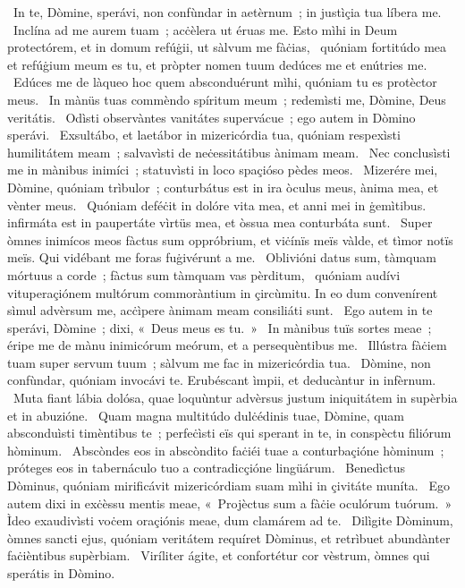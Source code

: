 \psalmChapterWithInscription{}
{ }
{%
~In te, Dòmine, sperávi, non confùndar in aetèrnum~; in justìçia tua líbera me. 
~Inclína ad me aurem tuam~; acċèlera ut éruas me. Esto mìhi in Deum protectórem, et in domum refúġii, ut sàlvum me fàċias, 
~quóniam fortitúdo mea et refúġium meum es tu, et pròpter nomen tuum dedúces me et enútries me. 
~Edúces me de làqueo hoc quem absconduérunt mìhi, quóniam tu es protèctor meus. 
~In mànüs tuas commèndo spíritum meum~; redemìsti me, Dòmine, Deus veritátis. 
~Odìsti observàntes vanitátes supervácue~; ego autem in Dòmino sperávi. 
~Exsultábo, et laetábor in mizericórdia tua, quóniam respexìsti humilitátem meam~; salvavìsti de neċessitátibus ànimam meam. 
~Nec conclusìsti me in mànibus inimíci~; statuvìsti in loco spaçióso pèdes meos. 
~Mizerére mei, Dòmine, quóniam trìbulor~; conturbátus est in ira òculus meus, ànima mea, et vènter meus. 
~Quóniam deféċit in dolóre vita mea, et anni mei in ġemìtibus. infirmáta est in paupertáte vìrtüs mea, et òssua mea conturbáta sunt. 
~Super òmnes inimícos meos fàctus sum oppróbrium, et viċínïs meïs vàlde, et tìmor notïs meïs. Qui vidébant me foras fuġivérunt a me. 
~Oblivióni datus sum, tàmquam mórtuus a corde~; fàctus sum tàmquam vas pèrditum, 
~quóniam audívi vituperaçiónem multórum commoràntium in çircùmitu. In eo dum convenírent sìmul advèrsum me, acċìpere ànimam meam consiliáti sunt. 
~Ego autem in te sperávi, Dòmine~; dixi, «~Deus meus es tu.~»
~In mànibus tuïs sortes meae~; éripe me de mànu inimicórum meórum, et a persequèntibus me. 
~Illústra fàċiem tuam super servum tuum~; sàlvum me fac in mizericórdia tua. 
~Dòmine, non confùndar, quóniam invocávi te. Erubéscant ìmpii, et deducàntur in infèrnum. 
~Muta fiant lábia dolósa, quae loquùntur advèrsus justum iniquitátem in supèrbia et in abuzióne. 
~Quam magna multitúdo dulċédinis tuae, Dòmine, quam absconduìsti timèntibus te~; perfeċìsti eïs qui sperant in te, in conspèctu filiórum hòminum. 
~Abscòndes eos in abscòndito faċiéi tuae a conturbaçióne hòminum~; próteges eos in tabernáculo tuo a contradicçióne lingüárum. 
~Benedìctus Dòminus, quóniam mirificávit mizericórdiam suam mìhi in çivitáte muníta. 
~Ego autem dixi in exċèssu mentis meae, «~Projèctus sum a fàċie oculórum tuórum.~» Ìdeo exaudivìsti voċem oraçiónis meae, dum clamárem ad te. 
~Dilìgite Dòminum, òmnes sancti ejus, quóniam veritátem requíret Dòminus, et retrìbuet abundànter faċièntibus supèrbiam. 
~Viríliter ágite, et confortétur cor vèstrum, òmnes qui sperátis in Dòmino. 
}
